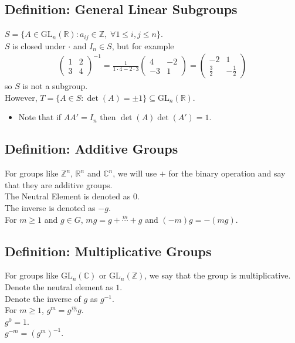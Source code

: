 \documentclass[11pt]{article}
\newcommand{\0}{\emptyset}
\newcommand{\Z}{\mathbb{Z}}
\newcommand{\R}{\mathbb{R}}
\newcommand{\C}{\mathbb{C}}
\begin{document}
\subsection*{Definition: General Linear Subgroups}
\label{sec:orgcb61019}
\(S=\{A\in\text{GL}_{n}(\R):a_{ij}\in\Z,\;\forall 1\leq i,j\leq n\}\).\\[0pt]
\(S\) is closed under \(\cdot\) and \(I_{n}\in S\), but for example\\[0pt]
\begin{align*}
  \begin{pmatrix}
    1 & 2 \\
    3 & 4
  \end{pmatrix}^{-1}
  = \frac{1}{1\cdot4-2\cdot3}
  \begin{pmatrix}
    4 & -2 \\
    -3 & 1
  \end{pmatrix}
  =
  \begin{pmatrix}
    -2 & 1 \\
    \frac{3}{2} & -\frac{1}{2}
  \end{pmatrix}
\end{align*}
so \(S\) is not a subgroup.\\[0pt]
However, \(T=\{A\in S:\det(A)=\pm1\} \subseteq \text{GL}_{n}(\R)\).\\[0pt]
\begin{itemize}
\item Note that if \(AA'=I_{n}\) then \(\det(A)\det(A')=1\).\\[0pt]
\end{itemize}
\subsection*{Definition: Additive Groups}
\label{sec:orge9b7fb0}
For groups like \(\Z^{n}\), \(\R^{n}\) and \(\C^{n}\), we will use \(+\) for the binary operation and say that they are additive groups.\\[0pt]
The Neutral Element is denoted as \(0\).\\[0pt]
The inverse is denoted as \(-g\).\\[0pt]
For \(m\geq 1\) and \(g\in G\), \(mg=g+\overset{m}{\cdots}+g\) and \((-m)g=-(mg)\).\\[0pt]
\subsection*{Definition: Multiplicative Groups}
\label{sec:org8966165}
For groups like \(\text{GL}_{n}(\C)\) or \(\text{GL}_{n}(\Z)\), we say that the group is multiplicative.\\[0pt]
Denote the neutral element as \(1\).\\[0pt]
Denote the inverse of \(g\) as \(g^{-1}\).\\[0pt]
For \(m\geq1\), \(g^{m}=g\overset{m}{\cdots}g\).\\[0pt]
\(g^{0}=1\).\\[0pt]
\(g^{-m}=(g^{m})^{-1}\).\\[0pt]
\end{document}
